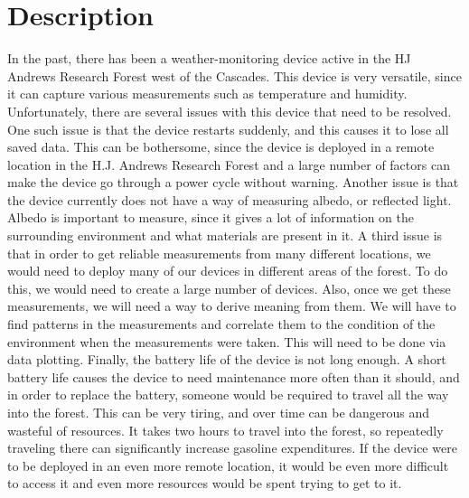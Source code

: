 \documentclass[onecolumn, draftclsnofoot,10pt, compsoc]{IEEEtran}
\begin{document}
\section{Description}
In the past, there has been a weather-monitoring device active in the HJ Andrews Research Forest west of the Cascades. This device is very versatile, since it can capture various measurements such as temperature and humidity. Unfortunately, there are several issues with this device that need to be resolved.
\newline
One such issue is that the device restarts suddenly, and this causes it to lose all saved data. This can be bothersome, since the device is deployed in a remote location in the H.J. Andrews Research Forest and a large number of factors can make the device go through a power cycle without warning. 
\newline
Another issue is that the device currently does not have a way of measuring albedo, or reflected light. Albedo is important to measure, since it gives a lot of information on the surrounding environment and what materials are present in it. 
\newline
A third issue is that in order to get reliable measurements from many different locations, we would need to deploy many of our devices in different areas of the forest. To do this, we would need to create a large number of devices. Also, once we get these measurements, we will need a way to derive meaning from them. We will have to find patterns in the measurements and correlate them to the condition of the environment when the measurements were taken. This will need to be done via data plotting.
\newline
Finally, the battery life of the device is not long enough. A short battery life causes the device to need maintenance more often than it should, and in order to replace the battery, someone would be required to travel all the way into the forest. This can be very tiring, and over time can be dangerous and wasteful of resources. It takes two hours to travel into the forest, so repeatedly traveling there can significantly increase gasoline expenditures. If the device were to be deployed in an even more remote location, it would be even more difficult to access it and even more resources would be spent trying to get to it.
\end{document}

